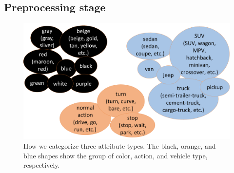 \subsection{Preprocessing stage}
\begin{figure} [!htb]
    \centering
    \includegraphics[width=\textwidth]{resources/images/methods/group_example.pdf}
    \caption{How we categorize three attribute types. The black, orange, and blue shapes show the group of color, action, and vehicle type, respectively.}
    \label{fig:group_example}
\end{figure}

